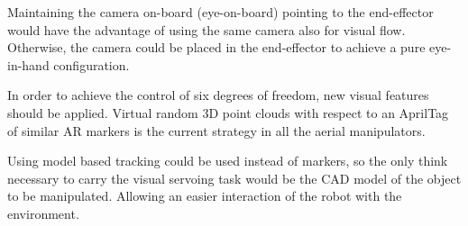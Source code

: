 Maintaining the camera on-board (eye-on-board) pointing to the end-effector would have the advantage of using the same camera also for visual flow. Otherwise, the camera could be placed in the end-effector to achieve a pure eye-in-hand configuration.

In order to achieve the control of six degrees of freedom, new visual features should be applied. Virtual random 3D point clouds with respect to an AprilTag of similar AR markers is the current strategy in all the aerial manipulators.

Using model based tracking could be used instead of markers, so the only think necessary to carry the visual servoing task would be the CAD model of the object to be manipulated. Allowing an easier interaction of the robot with the environment.